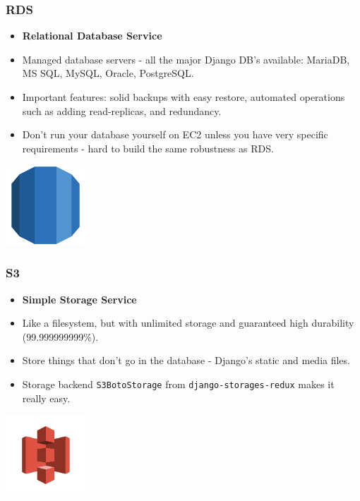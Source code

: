 \documentclass{beamer}
\begin{document}
\begin{frame}[fragile]\frametitle{RDS}

    \begin{itemize}
        \item \textbf{Relational Database Service}
        \item Managed database servers - all the major Django DB's available: MariaDB, MS SQL, MySQL, Oracle, PostgreSQL.
        \item Important features: solid backups with easy restore, automated operations such as adding read-replicas, and redundancy.
        \item Don't run your database yourself on EC2 unless you have very specific requirements - hard to build the same robustness as RDS.
    \end{itemize}

    \begin{center}
        \includegraphics[width=3cm]{aws-rds}
    \end{center}

\end{frame}


\begin{frame}[fragile]\frametitle{S3}

    \begin{itemize}
        \item \textbf{Simple Storage Service}
        \item Like a filesystem, but with unlimited storage and guaranteed high durability (99.999999999\%).
        \item Store things that don't go in the database - Django's static and media files.
        \item Storage backend \texttt{S3BotoStorage} from \texttt{django-storages-redux} makes it really easy.
    \end{itemize}

    \begin{center}
        \includegraphics[width=3cm]{aws-s3}
    \end{center}

\end{frame}
\end{document}
